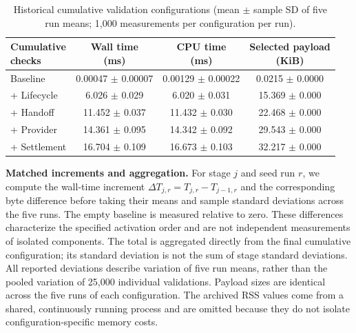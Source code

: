 \begin{table}[!t]
\centering
\caption{Historical cumulative validation configurations (mean $\pm$ sample SD of five run means; 1,000 measurements per configuration per run).}
\label{tab:f-cumulative-cost}
\footnotesize
\renewcommand{\arraystretch}{1.08}
\setlength{\tabcolsep}{3pt}
\begin{tabular*}{\columnwidth}{@{\hspace{3pt}}l@{\extracolsep{\fill}}ccc@{\hspace{3pt}}}
\toprule
\shortstack{\textbf{Cumulative}\\\textbf{checks}} & \shortstack{\textbf{Wall time}\\\textbf{(ms)}} & \shortstack{\textbf{CPU time}\\\textbf{(ms)}} & \shortstack{\textbf{Selected payload}\\\textbf{(KiB)}} \\
\midrule
Baseline & 0.00047 $\pm$ 0.00007 & 0.00129 $\pm$ 0.00022 & 0.0215 $\pm$ 0.0000 \\
+ Lifecycle & 6.026 $\pm$ 0.029 & 6.020 $\pm$ 0.031 & 15.369 $\pm$ 0.000 \\
+ Handoff & 11.452 $\pm$ 0.037 & 11.432 $\pm$ 0.030 & 22.468 $\pm$ 0.000 \\
+ Provider & 14.361 $\pm$ 0.095 & 14.342 $\pm$ 0.092 & 29.543 $\pm$ 0.000 \\
+ Settlement & 16.704 $\pm$ 0.109 & 16.673 $\pm$ 0.103 & 32.217 $\pm$ 0.000 \\
\bottomrule
\end{tabular*}
\end{table}


\noindent\textbf{Matched increments and aggregation.}
For stage $j$ and seed run $r$, we compute the wall-time increment
$\Delta T_{j,r}=T_{j,r}-T_{j-1,r}$ and the corresponding byte difference
before taking their means and sample standard deviations across the five runs.
The empty baseline is measured relative to zero.
These differences characterize the specified activation order and are not
independent measurements of isolated components.
The total is aggregated directly from the final cumulative configuration;
its standard deviation is not the sum of stage standard deviations.
All reported deviations describe variation of five run means, rather than
the pooled variation of 25,000 individual validations.
Payload sizes are identical across the five runs of each configuration.
The archived RSS values come from a shared, continuously running process and
are omitted because they do not isolate configuration-specific memory costs.

